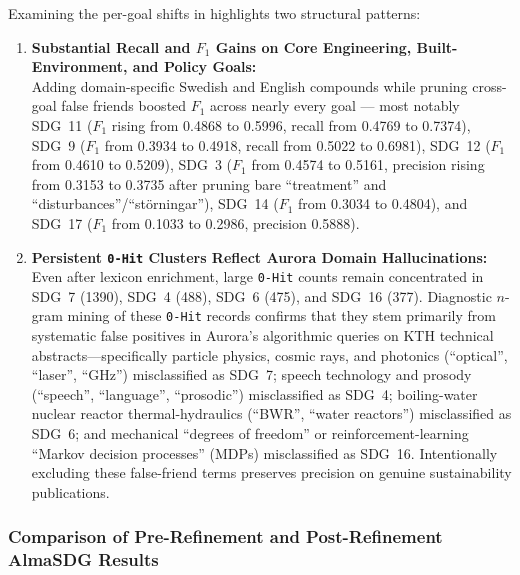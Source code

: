 Examining the per-goal shifts in  highlights two structural patterns:
\begin{enumerate}
  \item \textbf{Substantial Recall and $F_1$ Gains on Core Engineering, Built-Environment, and Policy Goals:}\\
  Adding domain-specific Swedish and English compounds while pruning cross-goal false friends boosted $F_1$ across nearly every goal --- most notably \gls{SDG}~11 ($F_1$ rising from \num{0.4868} to \num{0.5996}, recall from \num{0.4769} to \num{0.7374}), \gls{SDG}~9 ($F_1$ from \num{0.3934} to \num{0.4918}, recall from \num{0.5022} to \num{0.6981}), \gls{SDG}~12 ($F_1$ from \num{0.4610} to \num{0.5209}), \gls{SDG}~3 ($F_1$ from \num{0.4574} to \num{0.5161}, precision rising from \num{0.3153} to \num{0.3735} after pruning bare \enquote{treatment} and \enquote{disturbances}/\enquote{\foreignlanguage{swedish}{störningar}}), \gls{SDG}~14 ($F_1$ from \num{0.3034} to \num{0.4804}), and \gls{SDG}~17 ($F_1$ from \num{0.1033} to \num{0.2986}, precision \num{0.5888}).
  
  \item \textbf{Persistent \texttt{0-Hit} Clusters Reflect Aurora Domain Hallucinations:}\\
  Even after lexicon enrichment, large \texttt{0-Hit} counts remain concentrated in \gls{SDG}~7 (\num{1390}), \gls{SDG}~4 (\num{488}), \gls{SDG}~6 (\num{475}), and \gls{SDG}~16 (\num{377}). Diagnostic $n$-gram mining of these \texttt{0-Hit} records confirms that they stem primarily from systematic false positives in Aurora's algorithmic queries on \gls{KTH} technical abstracts—specifically particle physics, cosmic rays, and photonics (\enquote{optical}, \enquote{laser}, \enquote{GHz}) misclassified as \gls{SDG}~7; speech technology and prosody (\enquote{speech}, \enquote{language}, \enquote{prosodic}) misclassified as \gls{SDG}~4; boiling-water nuclear reactor thermal-hydraulics (\enquote{BWR}, \enquote{water reactors}) misclassified as \gls{SDG}~6; and mechanical \enquote{degrees of freedom} or reinforcement-learning \enquote{Markov decision processes} (MDPs) misclassified as \gls{SDG}~16. Intentionally excluding these false-friend terms preserves precision on genuine sustainability publications.
\end{enumerate}

\subsubsection{Comparison of Pre-Refinement and Post-Refinement AlmaSDG Results}
\label{sec:almasdg_pre_post_comparison}

